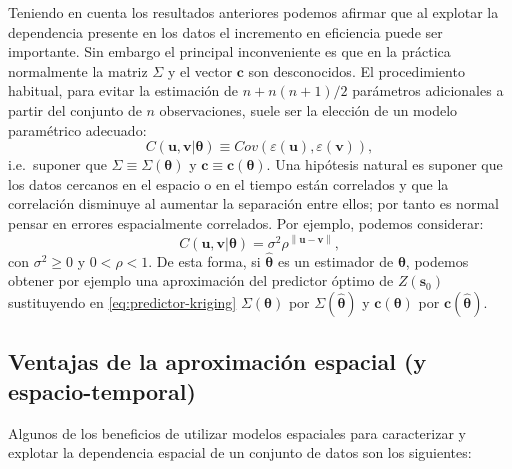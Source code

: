 \documentclass[
  spanish,
]{book}
\theoremstyle{break}
\begin{document}
Teniendo en cuenta los resultados anteriores podemos afirmar que al explotar la dependencia presente en los datos el incremento en eficiencia puede ser importante.
Sin embargo el principal inconveniente es que en la práctica normalmente la matriz \(\Sigma\) y el vector \(\mathbf{c}\) son desconocidos.
El procedimiento habitual, para evitar la estimación de \(n+n(n+1)/2\) parámetros adicionales a partir del
conjunto de \(n\) observaciones, suele ser la elección de un modelo paramétrico adecuado:
\[C(\mathbf{u},\mathbf{v}\left| \boldsymbol{\theta}\right. )\equiv Cov\left( \varepsilon (\mathbf{u}),\varepsilon (\mathbf{v})\right),\]
i.e.~suponer que \(\Sigma \equiv \Sigma\left( \boldsymbol{\theta}\right)\) y \(\mathbf{c}\equiv \mathbf{c}\left( \boldsymbol{\theta}\right)\).
Una hipótesis natural es suponer que los datos cercanos en el espacio o en el tiempo están correlados y que la correlación disminuye al aumentar la separación entre ellos; por tanto es normal pensar en errores espacialmente correlados.
Por ejemplo, podemos considerar:
\[C(\mathbf{u},\mathbf{v}\left| \boldsymbol{\theta}\right. )=\sigma^{2} \rho^{\left\| \mathbf{u}-\mathbf{v}\right\| },\]
con \(\sigma^{2} \geq 0\) y \(0<\rho <1\).
De esta forma, si \(\hat{\boldsymbol{\theta}}\) es un estimador de \(\boldsymbol{\theta}\), podemos obtener por ejemplo una aproximación del predictor óptimo de \(Z(\mathbf{s}_{0} )\) sustituyendo en \eqref{eq:predictor-kriging} \(\Sigma(\boldsymbol{\theta})\) por \(\Sigma(\hat{\boldsymbol{\theta}} )\) y \(\mathbf{c}(\boldsymbol{\theta})\) por \(\mathbf{c}(\hat{\boldsymbol{\theta}} )\).

\hypertarget{ventajas-de-la-aproximaciuxf3n-espacial-y-espacio-temporal}{%
\subsection{Ventajas de la aproximación espacial (y espacio-temporal)}\label{ventajas-de-la-aproximaciuxf3n-espacial-y-espacio-temporal}}

Algunos de los beneficios de utilizar modelos espaciales para caracterizar y explotar la dependencia espacial de un conjunto de datos son los siguientes:
\end{document}
